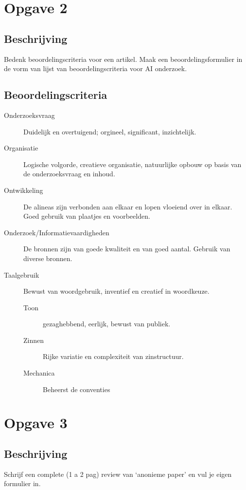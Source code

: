 \documentclass{article}
\begin{document}
\section{Opgave 2}
\subsection*{Beschrijving}
Bedenk beoordelingscriteria voor een artikel. Maak een beoordelingsformulier in de vorm van lijst van beoordelingscriteria voor AI onderzoek.
\subsection{Beoordelingscriteria}
\begin{description}
\item[Onderzoeksvraag] Duidelijk en overtuigend; orgineel, significant, inzichtelijk.
\item[Organisatie] Logische volgorde, creatieve organisatie, natuurlijke opbouw op basis van de onderzoeksvraag en inhoud.
\item[Ontwikkeling] De alineas zijn verbonden aan elkaar en lopen vloeiend over in elkaar. Goed gebruik van plaatjes en voorbeelden.
\item[Onderzoek/Informatievaardigheden] De bronnen zijn van goede kwaliteit en van goed aantal. Gebruik van diverse bronnen.
\item[Taalgebruik] Bewust van woordgebruik, inventief en creatief in woordkeuze.
\begin{description}
\item[Toon] gezaghebbend, eerlijk, bewust van publiek.
\item[Zinnen] Rijke variatie en complexiteit van zinstructuur.
\item[Mechanica] Beheerst de conventies
\end{description}
\end{description}

\section{Opgave 3}
\subsection*{Beschrijving}
Schrijf een complete (1 a 2 pag) review van `anonieme paper' en vul je eigen formulier in.
\end{document}
